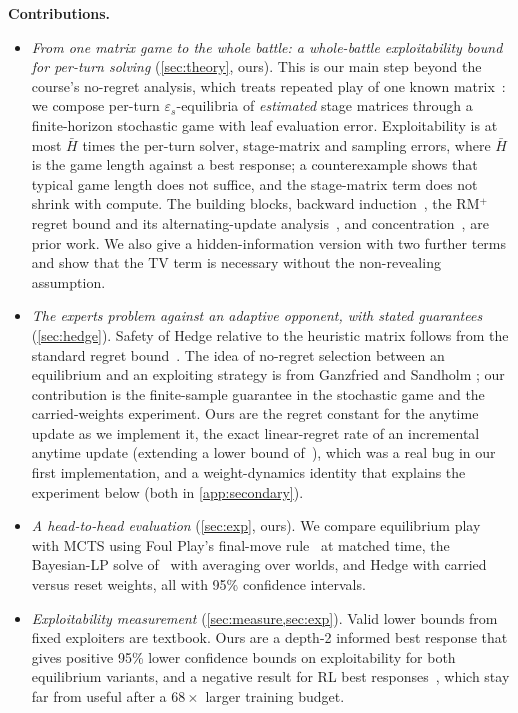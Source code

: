\documentclass[10pt]{article}
\theoremstyle{plain}
\theoremstyle{definition}
\theoremstyle{remark}
\newcommand{\Hbar}{\bar H}
\newcommand{\epss}{\varepsilon_s}
\begin{document}
\textbf{Contributions.}
\begin{itemize}
\item \emph{From one matrix game to the whole battle: a whole-battle exploitability bound for per-turn solving} (\cref{sec:theory}, ours). This is our main step beyond the course's no-regret analysis, which treats repeated play of one known matrix~\cite{CS535L6}: we compose per-turn $\epss$-equilibria of \emph{estimated} stage matrices through a finite-horizon stochastic game with leaf evaluation error. Exploitability is at most $\Hbar$ times the per-turn solver, stage-matrix and sampling errors, where $\Hbar$ is the game length against a best response; a counterexample shows that typical game length does not suffice, and the stage-matrix term does not shrink with compute. The building blocks, backward induction~\cite{Shapley53}, the RM$^+$ regret bound and its alternating-update analysis~\cite{Tam14,BMS19}, and concentration~\cite{BLM13}, are prior work. We also give a hidden-information version with two further terms and show that the TV term is necessary without the non-revealing assumption.
\item \emph{The experts problem against an adaptive opponent, with stated guarantees} (\cref{sec:hedge}). Safety of Hedge relative to the heuristic matrix follows from the standard regret bound~\cite{FS97,HW98,CBL06}. The idea of no-regret selection between an equilibrium and an exploiting strategy is from Ganzfried and Sandholm \cite{Gan15}; our contribution is the finite-sample guarantee in the stochastic game and the carried-weights experiment. Ours are the regret constant for the anytime update as we implement it, the exact linear-regret rate of an incremental anytime update (extending a lower bound of~\cite{OP18}), which was a real bug in our first implementation, and a weight-dynamics identity that explains the experiment below (both in \cref{app:secondary}).
\item \emph{A head-to-head evaluation} (\cref{sec:exp}, ours). We compare equilibrium play with MCTS using Foul Play's final-move rule~\cite{foulplay} at matched time, the Bayesian-LP solve of~\cite{Yu26} with averaging over worlds, and Hedge with carried versus reset weights, all with 95\% confidence intervals.
\item \emph{Exploitability measurement} (\cref{sec:measure,sec:exp}). Valid lower bounds from fixed exploiters are textbook. Ours are a depth-2 informed best response that gives positive 95\% lower confidence bounds on exploitability for both equilibrium variants, and a negative result for RL best responses~\cite{Tim20}, which stay far from useful after a $68\times$ larger training budget.

\end{itemize}
\end{document}
